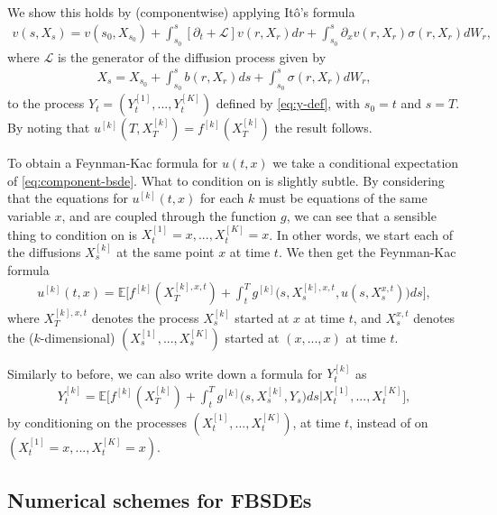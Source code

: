 \documentclass{article}  %
\begin{document}
We show this holds by (componentwise) applying Itô's formula
%
\begin{align} 
    v(s,X_s) = v(s_0,X_{s_0}) + \int_{s_0}^{s} [\partial_t + \mathcal{L}] v(r,X_r)dr + \int_{s_0}^{s} \partial_x v(r,X_r) \sigma(r,X_r)dW_r,
\end{align}
%
where $\mathcal{L}$ is the generator of the diffusion process given by
%
\begin{align} 
    X_s = X_{s_0} + \int_{s_0}^{s} b(r,X_r)ds + \int_{s_0}^{s}\sigma(r,X_r)dW_r,
\end{align}
%
to the process $Y_t=(Y_t^{[1]},...,Y_t^{[K]})$ defined by \autoref{eq:y-def}, with $s_0=t$ and $s=T$. By noting that $u^{[k]}(T,X_T^{[k]})=f^{[k]}(X_T^{[k]})$ the result follows.

To obtain a Feynman-Kac formula for $u(t,x)$ we take a conditional expectation of \autoref{eq:component-bsde}. What to condition on is slightly subtle. By considering that the equations for $u^{[k]}(t,x)$ for each $k$ must be equations of the same variable $x$, and are coupled through the function $g$, we can see that a sensible thing to condition on is $X_t^{[1]}=x,...,X_t^{[K]}=x$. In other words, we start each of the diffusions $X^{[k]}_s$ at the same point $x$ at time $t$.
We then get the Feynman-Kac formula
%
\begin{align} 
    u^{[k]}(t,x) = \mathbb{E}\bigg[ f^{[k]}(X_T^{[k],x,t}) + \int_{t}^{T} g^{[k]}\big( s, X_s^{[k],x,t}, u(s,X_s^{x,t}) \big)ds \bigg],
\end{align}
%
where $X_T^{[k],x,t}$ denotes the process $X_s^{[k]}$ started at $x$ at time $t$, and $X_s^{x,t}$ denotes the ($k$-dimensional) $(X_s^{[1]},...,X_s^{[K]})$ started at $(x,...,x)$ at time $t$.

Similarly to before, we can also write down a formula for $Y_t^{[k]}$ as 
%
\begin{align}
Y_t^{[k]} = \mathbb{E}\bigg[ f^{[k]}(X_T^{[k]}) + \int_{t}^{T} g^{[k]}\big( s,X_s^{[k]},Y_s\big)ds \Big\lvert X_t^{[1]},...,X_t^{[K]}\bigg],
\end{align}
%
by conditioning on the processes $(X_t^{[1]},...,X_t^{[K]})$, at time $t$, instead of on $(X_t^{[1]}=x,...,X_t^{[K]}=x)$.

\subsection{Numerical schemes for FBSDEs}
\end{document}
